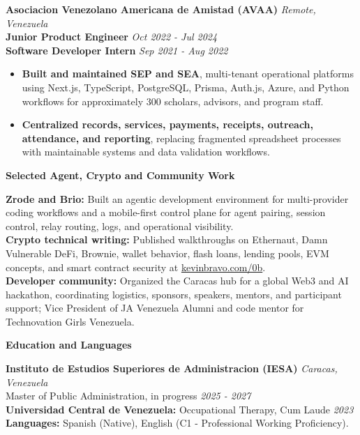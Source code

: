 \documentclass[10pt]{article}
\newcommand{\sectiontitle}[1]{%
    \vspace{3pt}
    \begin{center}
        \textbf{#1}
    \end{center}
    \vspace{-5pt}
}
\begin{document}
\vspace{1pt}
\textbf{Asociacion Venezolano Americana de Amistad (AVAA)} \hfill \textit{Remote, Venezuela} \\
\textbf{Junior Product Engineer} \hfill \textit{Oct 2022 - Jul 2024} \\
\textbf{Software Developer Intern} \hfill \textit{Sep 2021 - Aug 2022}
\begin{itemize}
    \item \textbf{Built and maintained SEP and SEA}, multi-tenant operational platforms using Next.js, TypeScript, PostgreSQL, Prisma, Auth.js, Azure, and Python workflows for approximately 300 scholars, advisors, and program staff.
    \item \textbf{Centralized records, services, payments, receipts, outreach, attendance, and reporting}, replacing fragmented spreadsheet processes with maintainable systems and data validation workflows.
\end{itemize}

\sectiontitle{Selected Agent, Crypto and Community Work}
\textbf{Zrode and Brio:} Built an agentic development environment for multi-provider coding workflows and a mobile-first control plane for agent pairing, session control, relay routing, logs, and operational visibility. \\
\textbf{Crypto technical writing:} Published walkthroughs on Ethernaut, Damn Vulnerable DeFi, Brownie, wallet behavior, flash loans, lending pools, EVM concepts, and smart contract security at \href{https://kevinbravo.com/0b}{kevinbravo.com/0b}. \\
\textbf{Developer community:} Organized the Caracas hub for a global Web3 and AI hackathon, coordinating logistics, sponsors, speakers, mentors, and participant support; Vice President of JA Venezuela Alumni and code mentor for Technovation Girls Venezuela.

\sectiontitle{Education and Languages}
\textbf{Instituto de Estudios Superiores de Administracion (IESA)} \hfill \textit{Caracas, Venezuela} \\
Master of Public Administration, in progress \hfill \textit{2025 - 2027} \\
\textbf{Universidad Central de Venezuela:} Occupational Therapy, Cum Laude \hfill \textit{2023} \\
\textbf{Languages:} Spanish (Native), English (C1 - Professional Working Proficiency).
\end{document}
